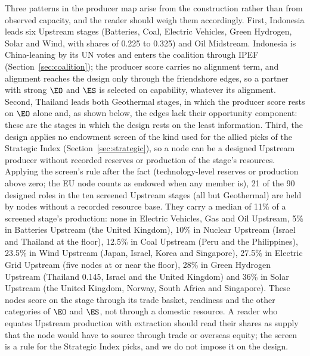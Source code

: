 Three patterns in the producer map arise from the construction rather than from observed
capacity, and the reader should weigh them accordingly. First, Indonesia leads six Upstream
stages (Batteries, Coal, Electric Vehicles, Green Hydrogen, Solar and Wind, with shares of 0.225
to 0.325) and Oil Midstream. Indonesia is China-leaning by its UN votes and enters the coalition
through IPEF (Section~\ref{sec:coalition}); the producer score carries no alignment term, and
alignment reaches the design only through the friendshore edges, so a partner with strong $\EO$
and $\ES$ is selected on capability, whatever its alignment. Second, Thailand leads both
Geothermal stages, in which the producer score rests on $\EO$ alone and, as shown below, the
edges lack their opportunity component: these are the stages in which the design rests on the
least information. Third, the design applies no endowment screen of the kind used for the
allied picks of the Strategic Index (Section~\ref{sec:strategic}), so a node can be a designed
Upstream producer without recorded reserves or production of the stage's resources. Applying the
screen's rule after the fact (technology-level reserves or production above zero; the EU node
counts as endowed when any member is), 21 of the 90 designed roles in the ten screened Upstream
stages (all but Geothermal) are held by nodes without a recorded resource base. They carry a
median of 11\% of a screened stage's production: none in Electric Vehicles, Gas and Oil Upstream,
5\% in Batteries Upstream (the United Kingdom), 10\% in Nuclear Upstream (Israel and Thailand at
the floor), 12.5\% in Coal Upstream (Peru and the Philippines), 23.5\% in Wind Upstream (Japan,
Israel, Korea and Singapore), 27.5\% in Electric Grid Upstream (five nodes at or near the floor),
28\% in Green Hydrogen Upstream (Thailand 0.145, Israel and the United Kingdom) and 36\% in Solar
Upstream (the United Kingdom, Norway, South Africa and Singapore). These nodes score on the stage
through its trade basket, readiness and the other categories of $\EO$ and $\ES$, not through a
domestic resource. A reader who equates Upstream production with extraction should read their
shares as supply that the node would have to source through trade or overseas equity; the screen
is a rule for the Strategic Index picks, and we do not impose it on the design.



